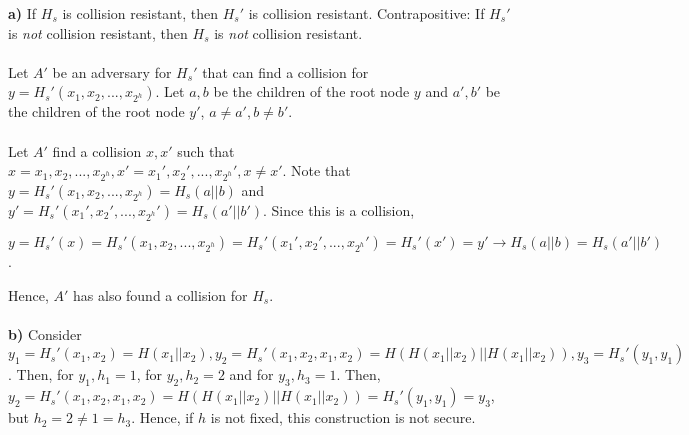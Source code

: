 \documentclass[12pt]{article}
\begin{document}
\noindent \textbf{a)} If $H_s$ is collision resistant, then $H_s'$ is collision resistant. Contrapositive: If $H_s'$ is \emph{not} collision resistant, then $H_s$ is \emph{not} collision resistant.
\\
\\
Let $A'$ be an adversary for $H_s'$ that can find a collision for $y = H_s'(x_1, x_2,...,x_{2^h})$. Let $a, b$ be the children of the root node $y$ and $a', b'$ be the children of the root node $y'$, $a \neq a', b \neq b'$. 
\\
\\
Let $A'$ find a collision $x, x'$ such that $x = x_1, x_2,...,x_{2^h}, x' = x_1', x_2',...,x_{2^h}', x \neq x'$. Note that $y = H_s'(x_1, x_2,...,x_{2^h}) = H_s(a||b)$ and $y' = H_s'(x_1', x_2',...,x_{2^h}') = H_s(a'||b')$. Since this is a collision, 
\begin{center}
$y = H_s'(x) = H_s'(x_1, x_2,...,x_{2^h}) =  H_s'(x_1', x_2',...,x_{2^h}')= H_s'(x')=y' \rightarrow  H_s(a||b)=H_s(a'||b')$. 
\end{center}
Hence, $A'$ has also found a collision for $H_s$.
\\
\\
\noindent \textbf{b)} Consider $y_1 = H_s'(x_1, x_2) = H(x_1||x_2), y_2 =H_s'(x_1, x_2,x_1,x_2) = H(H(x_1||x_2)||H(x_1||x_2)), y_3 = H_s'(y_1, y_1)$. Then, for $y_1, h_1 = 1$, for $y_2, h_2 = 2$ and for $y_3, h_3 = 1$. Then, $y_2 =H_s'(x_1, x_2,x_1,x_2) = H(H(x_1||x_2)||H(x_1||x_2)) = H_s'(y_1, y_1) = y_3$, but $h_2 = 2 \neq 1 = h_3$. Hence, if $h$ is not fixed, this construction is not secure.
\end{document}

